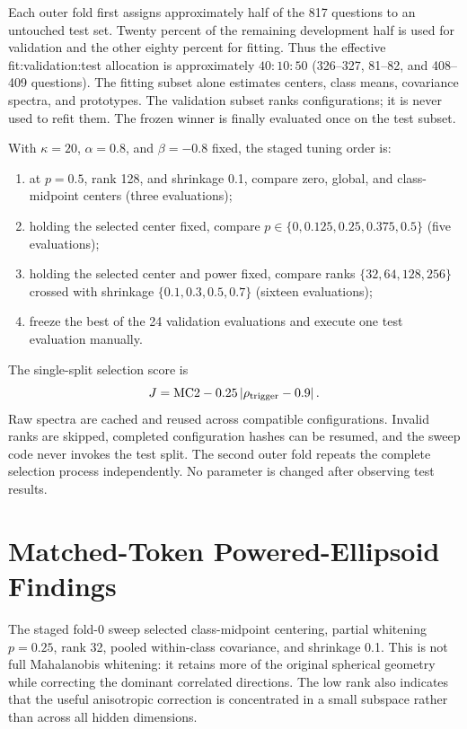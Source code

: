 \documentclass[11pt]{article}
\begin{document}
Each outer fold first assigns approximately half of the 817 questions to an
untouched test set. Twenty percent of the remaining development half is used
for validation and the other eighty percent for fitting. Thus the effective
fit:validation:test allocation is approximately $40:10:50$ (326--327,
81--82, and 408--409 questions). The fitting subset alone estimates centers,
class means, covariance spectra, and prototypes. The validation subset ranks
configurations; it is never used to refit them. The frozen winner is finally
evaluated once on the test subset.

With $\kappa=20$, $\alpha=0.8$, and $\beta=-0.8$ fixed, the staged tuning order is:
\begin{enumerate}
  \item at $p=0.5$, rank 128, and shrinkage 0.1, compare zero, global,
        and class-midpoint centers (three evaluations);
  \item holding the selected center fixed, compare
        $p\in\{0,0.125,0.25,0.375,0.5\}$ (five evaluations);
  \item holding the selected center and power fixed, compare ranks
        $\{32,64,128,256\}$ crossed with shrinkage
        $\{0.1,0.3,0.5,0.7\}$ (sixteen evaluations);
  \item freeze the best of the 24 validation evaluations and execute one test
        evaluation manually.
\end{enumerate}
The single-split selection score is
\begin{equation}
 J=\mathrm{MC2}-0.25\left|\rho_{\rm trigger}-0.9\right|.
\end{equation}
Raw spectra are cached and reused across compatible configurations. Invalid
ranks are skipped, completed configuration hashes can be resumed, and the
sweep code never invokes the test split.
The second outer fold repeats the complete selection process independently.
No parameter is changed after observing test results.

\section{Matched-Token Powered-Ellipsoid Findings}

The staged fold-0 sweep selected class-midpoint centering, partial whitening
$p=0.25$, rank 32, pooled within-class covariance, and shrinkage 0.1. This is
not full Mahalanobis whitening: it retains more of the original spherical
geometry while correcting the dominant correlated directions. The low rank
also indicates that the useful anisotropic correction is concentrated in a
small subspace rather than across all hidden dimensions.
\end{document}
